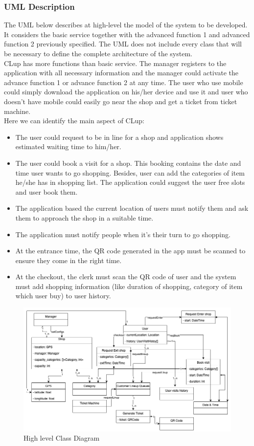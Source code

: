\subsubsection{UML Description}
The UML below describes at high-level the model of the system to be developed. It considers the basic service together with the advanced function 1 and advanced function 2 previously specified. The UML does not include every class that will be necessary to define the complete architecture of the system.\\
CLup has more functions than basic service. The manager registers to the application with all necessary information and the manager could activate the advance function 1 or advance function 2 at any time. The user who use mobile could simply download the application on his/her device and use it and user who doesn't have mobile could easily go near the shop and get a ticket from ticket machine.\\
Here we can identify the main aspect of CLup:
\begin{itemize}
    \item The user could request to be in line for a shop and application shows estimated waiting time to him/her.
    \item The user could book a visit for a shop. This booking contains the date and time user wants to go shopping. Besides, user can add the categories of item he/she has in shopping list. The application could suggest the user free slots and user book them.
    \item The application based the current location of users must notify them and ask them to approach the shop in a suitable time.
    \item The application must notify people when it's their turn to go shopping.
    \item At the entrance time, the QR code generated in the app must be scanned to ensure they come in the right time.
    \item At the checkout, the clerk must scan the QR code of user and the system must add shopping information (like duration of shopping, category of item which user buy) to user history.
\end{itemize}

\begin{figure}[H]
  \includegraphics[width=\textwidth,height=\textheight,keepaspectratio]{images/ClassDiagram.png}
  \caption{High level Class Diagram}
  \label{fig:ClassDiagram}
\end{figure}

